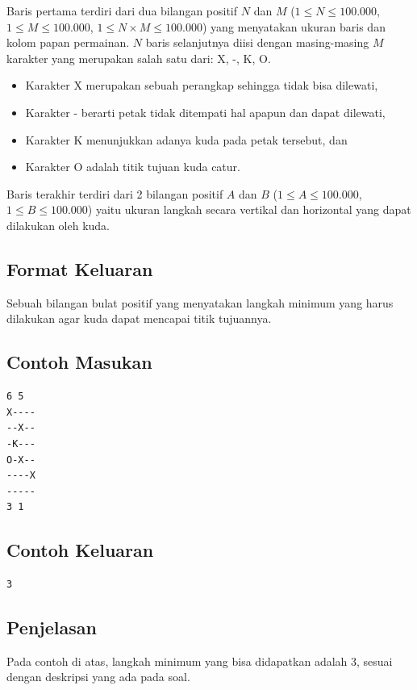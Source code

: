 \documentclass{article}
\begin{document}
Baris pertama terdiri dari dua bilangan positif $N$ dan $M$ ($1 \leq N \leq 100.000$, $1 \leq M \leq 100.000$, $1 \leq N \times M \leq 100.000$) yang menyatakan ukuran baris dan kolom papan permainan.
$N$ baris selanjutnya diisi dengan masing-masing $M$ karakter yang merupakan salah satu dari: X, -, K, O.

\begin{itemize}
    \setlength\itemsep{0pt}
    \item Karakter X merupakan sebuah perangkap sehingga tidak bisa dilewati,
    \item Karakter - berarti petak tidak ditempati hal apapun dan dapat dilewati,
    \item Karakter K menunjukkan adanya kuda pada petak tersebut, dan
    \item Karakter O adalah titik tujuan kuda catur.
\end{itemize}

Baris terakhir terdiri dari 2 bilangan positif $A$ dan $B$ ($1 \leq A \leq 100.000$, $1 \leq B \leq 100.000$) yaitu ukuran langkah secara vertikal dan horizontal yang dapat dilakukan oleh kuda.

\subsection*{Format Keluaran}

Sebuah bilangan bulat positif yang menyatakan  langkah minimum yang harus dilakukan agar kuda dapat mencapai titik tujuannya.
\\

\begin{multicols}{2}
\subsection*{Contoh Masukan}
\begin{lstlisting}
6 5
X----
--X--
-K---
O-X--
----X
-----
3 1
\end{lstlisting}
\columnbreak
\subsection*{Contoh Keluaran}
\begin{lstlisting}
3
\end{lstlisting}
\vfill
\null
\end{multicols}

\subsection*{Penjelasan}
Pada contoh di atas, langkah minimum yang bisa didapatkan adalah 3, sesuai dengan deskripsi yang ada pada soal.
\pagebreak
\end{document}
